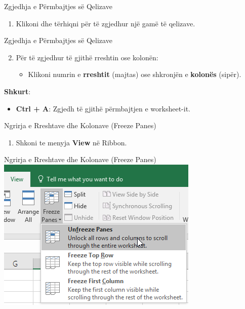 \documentclass[
  ignorenonframetext,
]{beamer}
\providecommand{\tightlist}{%
  \setlength{\itemsep}{0pt}\setlength{\parskip}{0pt}}
\begin{document}
\begin{frame}{Zgjedhja e Përmbajtjes së Qelizave}
\label{zgjedhja-e-puxebrmbajtjes-suxeb-qelizave}
\begin{enumerate}
\tightlist
\item
  Klikoni dhe tërhiqni për të zgjedhur një gamë të qelizave.
\end{enumerate}
\end{frame}

\begin{frame}{Zgjedhja e Përmbajtjes së Qelizave}
\label{zgjedhja-e-puxebrmbajtjes-suxeb-qelizave-1}
\begin{enumerate}
\setcounter{enumi}{1}
\item
  Për të zgjedhur të gjithë rreshtin ose kolonën:

  \begin{itemize}
  \tightlist
  \item
    Klikoni numrin e \textbf{rreshtit} (majtas) ose shkronjën e
    \textbf{kolonës} (sipër).
  \end{itemize}
\end{enumerate}

\textbf{Shkurt}:

\begin{itemize}
\tightlist
\item
  \textbf{Ctrl + A}: Zgjedh të gjithë përmbajtjen e worksheet-it.
\end{itemize}
\end{frame}

\begin{frame}{Ngrirja e Rreshtave dhe Kolonave (Freeze Panes)}
\label{ngrirja-e-rreshtave-dhe-kolonave-freeze-panes}
\begin{enumerate}
\tightlist
\item
  Shkoni te menyja \textbf{View} në Ribbon.
\end{enumerate}
\end{frame}

\begin{frame}{Ngrirja e Rreshtave dhe Kolonave (Freeze Panes)}
\label{ngrirja-e-rreshtave-dhe-kolonave-freeze-panes-1}
\includegraphics{./images/excel7.png}
\end{frame}
\end{document}
